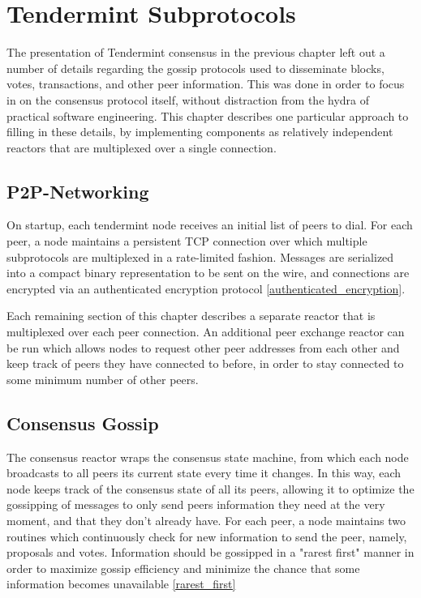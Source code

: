 \chapter{Tendermint Subprotocols}
\label{ch:subprotocols}

The presentation of Tendermint consensus in the previous chapter left out a number of details
regarding the gossip protocols used to disseminate blocks, votes, transactions, 
and other peer information. 
This was done in order to focus in on the consensus protocol itself, 
without distraction from the hydra of practical software engineering.
This chapter describes one particular approach to filling in these details,
by implementing components as relatively independent reactors that are multiplexed over a single connection.

\section{P2P-Networking}

On startup, each tendermint node receives an initial list of peers to dial.
For each peer, a node maintains a persistent TCP connection over which multiple subprotocols are multiplexed in a rate-limited fashion.
Messages are serialized into a compact binary representation to be sent on the wire, and 
connections are encrypted via an authenticated encryption protocol \ref{authenticated_encryption}.

Each remaining section of this chapter describes a separate reactor that is multiplexed over each peer connection.
An additional peer exchange reactor can be run which allows nodes to request other peer addresses from each other and keep track of peers they have connected to before,
in order to stay connected to some minimum number of other peers.

\section{Consensus Gossip}

The consensus reactor wraps the consensus state machine, 
from which each node broadcasts to all peers its current state every time it changes.
In this way, each node keeps track of the consensus state of all its peers, 
allowing it to optimize the gossipping of messages to only send peers information they need at the very moment,
and that they don't already have.
For each peer, a node maintains two routines which continuously check for new information to send the peer,
namely, proposals and votes. 
Information should be gossipped in a "rarest first" manner in order to maximize 
gossip efficiency and minimize the chance that some information becomes unavailable \ref{rarest_first}


